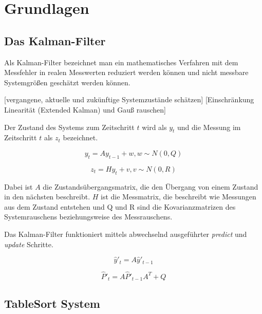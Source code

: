 \chapter{Grundlagen}




\section{Das Kalman-Filter}
Als Kalman-Filter bezeichnet man ein mathematisches Verfahren mit dem Messfehler in realen Messwerten reduziert werden können und nicht messbare Systemgrößen geschätzt werden können. 


[vergangene, aktuelle und zukünftige Systemzustände schätzen]
[Einschränkung Linearität (Extended Kalman) und Gauß rauschen]

Der Zustand des Systems zum Zeitschritt \(t\) wird als \(y_t\) und die Messung im Zeitschritt \(t\) als \(z_t\) bezeichnet.

\begin{equation}
	y_t = A y_{t-1} + w, 	w \sim N(0, Q)
\end{equation}

\begin{equation}
	z_t = H y_{t} + v, 	v \sim N(0, R)
\end{equation}

Dabei ist \(A\) die Zustandsübergangsmatrix, die den Übergang von einem Zustand in den nächsten beschreibt.
\(H\) ist die Messmatrix, die beschreibt wie Messungen aus dem Zustand entstehen und Q und R sind die Kovarianzmatrizen des Systemrauschens beziehungsweise des Messrauschens. 

Das Kalman-Filter funktioniert mittels abwechselnd ausgeführter \textit{predict} und \textit{update} Schritte.

\begin{equation}
\hat{y}'_t = A \hat{y}'_{t-1}
\end{equation}

\begin{equation}
	\hat{P}'_t = A \hat{P}'_{t-1} A^\textit{T} + Q
\end{equation}


\section{TableSort System}

